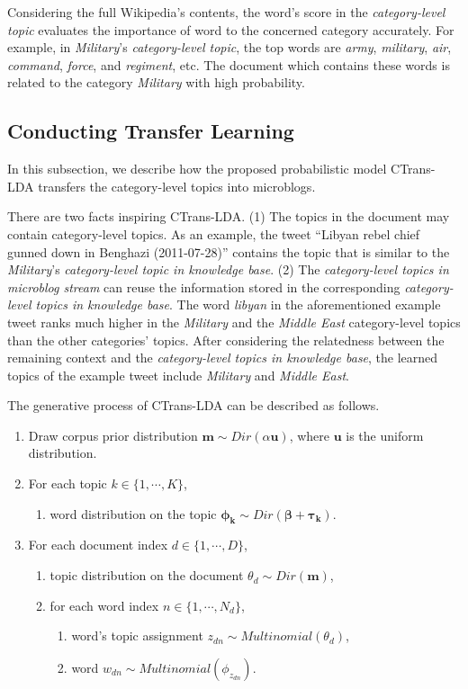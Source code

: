\documentclass[runningheads,a4paper]{llncs}
\theoremstyle{exampstyle}
\begin{document}
Considering the full Wikipedia's contents, the word's score in the \textit{category-level topic} evaluates the importance of word to the concerned category accurately. 
For example, in \textit{Military}'s \textit{category-level topic}, the top  words are \textit{army}, \textit{military}, \textit{air}, \textit{command}, \textit{force}, and \textit{regiment}, etc. 
The document which contains these words is related to the category \textit{Military} with high probability. 

\subsection{Conducting Transfer Learning}
\label{subsec:rs_initialization}
In this subsection, we describe how the proposed probabilistic model CTrans-LDA transfers the category-level topics into microblogs.

There are two facts inspiring CTrans-LDA. 
(1) The topics in the document may contain category-level topics. 
As an example, the tweet ``Libyan rebel chief gunned down in Benghazi (2011-07-28)'' contains the topic that is similar to the \textit{Military}'s \textit{category-level topic in knowledge base}.
(2) The \textit{category-level topics in microblog stream} can reuse the information stored in the corresponding \textit{category-level topics in knowledge base}.
The word \textit{libyan} in the aforementioned example tweet ranks much higher in the \textit{Military} and the \textit{Middle East} category-level topics than the other categories' topics.
After considering the relatedness between the remaining context and the \textit{category-level topics in knowledge base}, the learned topics of the example tweet include \textit{Military} and \textit{Middle East}. 

The generative process of CTrans-LDA can be described as follows.
\begin{enumerate}[topsep=0pt,itemsep=0mm]
\item Draw corpus prior distribution \(\bm{m} \sim Dir(\alpha \bm{u})\), where \(\bm{u}\) is the uniform distribution.
\item For each topic \(k \in \{1,\cdots,K\}\), 
\begin{enumerate}[itemsep=0mm]
\item word distribution on the topic \(\bm{\phi_k} \sim Dir(\bm{\beta}+ \bm{\tau_k})\).
\end{enumerate}
\item For each document index \(d \in \{1,\cdots,D\}\),
\begin{enumerate}[itemsep=0mm]
\item topic distribution on the document \(\theta_d \sim Dir(\bm{m})\),
\item for each word index \(n \in \{1,\cdots,N_d\}\),
\begin{enumerate}[itemsep=0mm]
\item word's topic assignment \(z_{dn} \sim Multinomial(\theta_d)\), 
\item word \(w_{dn} \sim Multinomial(\phi_{z_{dn}})\). 
\end{enumerate}
\end{enumerate}

\end{enumerate}
\end{document}
